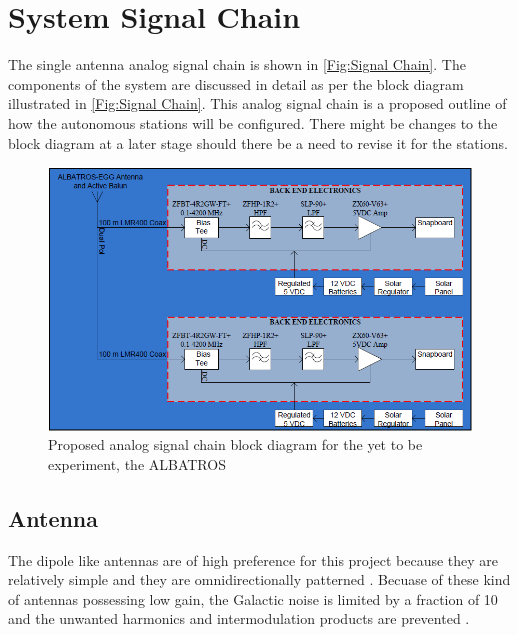 \documentclass[12pt,a4paper]{report}
\begin{document}
			
	\newpage
	\newpage	
	\section{System Signal Chain}	
	The single antenna analog signal chain is shown in \autoref{Fig:Signal Chain}. The components of the system are discussed in detail as per the block diagram illustrated in \autoref{Fig:Signal Chain}. This analog signal chain is a proposed outline of how the autonomous stations will be configured. There might be changes to the block diagram at a later stage should there be a need to revise it for the stations.
		
		\begin{figure}[htb]
			\begin{center}
				\includegraphics[width=1.0\linewidth]{Figures/Signal-Chain.png}
				\caption{Proposed analog signal chain block diagram for the yet to be experiment, the ALBATROS}
				\label{Fig:Signal Chain}
			\end{center}
		\end{figure}
	
	\subsection{Antenna}	
	The dipole like antennas are of high preference for this project because they are relatively simple and they are omnidirectionally patterned \cite{Memo28}. Becuase of these kind of antennas possessing low gain, the Galactic noise is limited by a fraction of 10 and the unwanted harmonics and intermodulation products are prevented \cite{Memo28,Memo27}.\\
	
\end{document}
